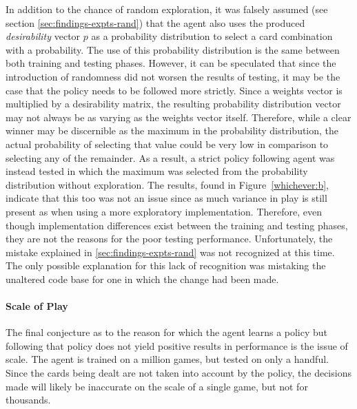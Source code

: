 In addition to the chance of random exploration,
it was falsely assumed (see section \ref{sec:findings-expts-rand}) that
the agent also uses the produced \textit{desirability} vector $p$
as a probability distribution to select a card combination with a probability.
%
The use of this probability distribution is the same between both training 
and testing phases.
%
However,
it can be speculated that since the introduction of randomness did not worsen
the results of testing,
it may be the case that the policy needs to be followed more strictly.
%
Since a weights vector is multiplied by a desirability matrix,
the resulting probability distribution vector may not always be as
varying as the weights vector itself.
%
Therefore,
while a clear winner may be discernible as the maximum in the probability
distribution,
the actual probability of selecting that value could be very low in comparison
to selecting any of the remainder.
%
As a result,
a strict policy following agent was instead tested in which the maximum was
selected from the probability distribution without exploration.
%
The results,
found in Figure~\ref{whichever:b},
indicate that this too was not an issue
since as much variance in play is still present as when using a more exploratory
implementation.
%
Therefore,
even though implementation differences exist between the training and testing
phases,
they are not the reasons for the poor testing performance.
%
Unfortunately,
the mistake explained in \ref{sec:findings-expts-rand} was not recognized
at this time.
%
The only possible explanation for this lack of recognition was mistaking the
unaltered code base for one in which the change had been made.


\paragraph{Scale of Play}

The final conjecture as to the reason for which the agent learns a policy
but following that policy does not yield positive results in performance
is the issue of scale.
%
The agent is trained on a million games,
but tested on only a handful.
%
Since the cards being dealt are not taken into account by the policy,
the decisions made will likely be inaccurate on the scale of a single game,
but not for thousands.




